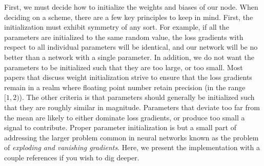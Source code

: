 \documentclass[
]{article}
\begin{document}
First, we must decide how to initialize the weights and biases of our
node. When deciding on a scheme, there are a few key principles to keep
in mind. First, the initialization must exhibit symmetry of any sort.
For example, if all the parameters are initialized to the same random
value, the loss gradients with respect to all individual parameters will
be identical, and our network will be no better than a network with a
single parameter. In addition, we do not want the parameters to be
initialized such that they are too large, or too small. Most papers that
discuss weight initialization strive to ensure that the loss gradients
remain in a realm where floating point number retain precision (in the
range \([1, 2)\)). The other criteria is that parameters should
generally be initialized such that they are roughly similar in
magnitude. Parameters that deviate too far from the mean are likely to
either dominate loss gradients, or produce too small a signal to
contribute. Proper parameter initialization is but a small part of
addressing the larger problem common in neural networks known as the
problem of \emph{exploding and vanishing gradients}. Here, we present
the implementation with a couple references if you wish to dig deeper.
\end{document}
